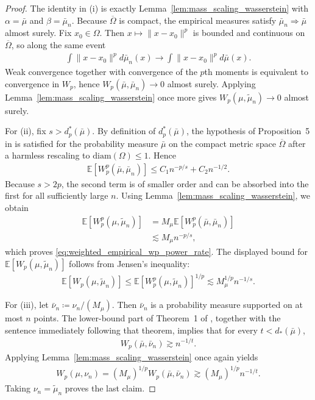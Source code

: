 \documentclass[11pt,reqno]{amsart}
\theoremstyle{definition}
\renewcommand{\tilde}{\widetilde}
\newcommand{\Ep}{\mathbb{E}}
\begin{document}
\begin{proof}
The identity in (i) is exactly Lemma~\ref{lem:mass_scaling_wasserstein} with $\alpha=\bar\mu$ and $\beta=\bar\mu_n$.
Because $\overline{\Omega}$ is compact, the empirical measures satisfy $\bar\mu_n \Rightarrow \bar\mu$ almost surely.
Fix $x_0\in\Omega$.
Then $x\mapsto \|x-x_0\|^p$ is bounded and continuous on $\overline{\Omega}$, so along the same event
\begin{align*}
    \int \|x-x_0\|^p d\bar\mu_n(x)
    \to
    \int \|x-x_0\|^p d\bar\mu(x).
\end{align*}
Weak convergence together with convergence of the $p$th moments is equivalent to convergence in $W_p$, hence $W_p(\bar\mu,\bar\mu_n)\to 0$ almost surely.
Applying Lemma~\ref{lem:mass_scaling_wasserstein} once more gives $W_p(\mu,\tilde\mu_n)\to 0$ almost surely.

For (ii), fix $s>d_p^*(\bar\mu)$.
By definition of $d_p^*(\bar\mu)$, the hypothesis of Proposition~5 in \cite{weed2019sharp} is satisfied for the probability measure $\bar\mu$ on the compact metric space $\overline{\Omega}$ after a harmless rescaling to $\mathrm{diam}(\Omega)\le 1$.
Hence
\begin{align*}
    \Ep[W_p^p(\bar\mu,\bar\mu_n)]
    \le
    C_1 n^{-p/s} + C_2 n^{-1/2}.
\end{align*}
Because $s>2p$, the second term is of smaller order and can be absorbed into the first for all sufficiently large $n$.
Using Lemma~\ref{lem:mass_scaling_wasserstein}, we obtain
\begin{align*}
    \Ep[W_p^p(\mu,\tilde\mu_n)]
    &=
    M_\mu \Ep[W_p^p(\bar\mu,\bar\mu_n)]
    \\
    &\lesssim
    M_\mu n^{-p/s},
\end{align*}
which proves \eqref{eq:weighted_empirical_wp_power_rate}.
The displayed bound for $\Ep[W_p(\mu,\tilde\mu_n)]$ follows from Jensen's inequality:
\begin{align*}
    \Ep[W_p(\mu,\tilde\mu_n)]
    \le
    \Ep[W_p^p(\mu,\tilde\mu_n)]^{1/p}
    \lesssim
    M_\mu^{1/p} n^{-1/s}.
\end{align*}

For (iii), let $\bar\nu_n \coloneqq \nu_n/(M_\mu)$.
Then $\bar\nu_n$ is a probability measure supported on at most $n$ points.
The lower-bound part of Theorem~1 of \cite{weed2019sharp}, together with the sentence immediately following that theorem, implies that for every $t<d_*(\bar\mu)$,
\begin{align*}
    W_p(\bar\mu,\bar\nu_n) \gtrsim n^{-1/t}.
\end{align*}
Applying Lemma~\ref{lem:mass_scaling_wasserstein} once again yields
\begin{align*}
    W_p(\mu,\nu_n)
    =
    (M_\mu)^{1/p} W_p(\bar\mu,\bar\nu_n)
    \gtrsim
    (M_\mu)^{1/p} n^{-1/t}.
\end{align*}
Taking $\nu_n=\tilde\mu_n$ proves the last claim.
\end{proof}
\end{document}
